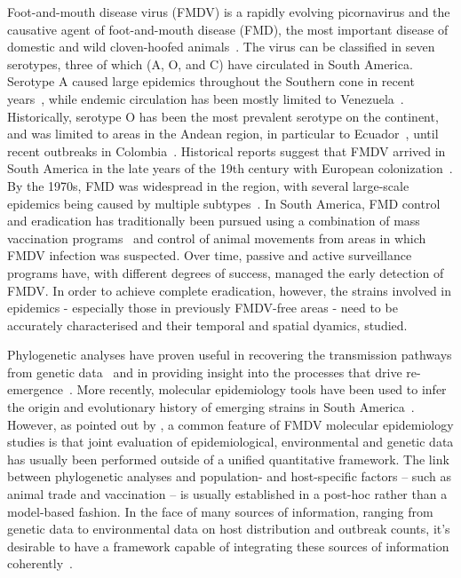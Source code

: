 \documentclass[10pt]{article}
\begin{document}
Foot-and-mouth disease virus (FMDV) is a rapidly evolving picornavirus and the causative agent of foot-and-mouth disease (FMD), the most important disease of domestic and wild cloven-hoofed animals~\citep{Grubman2004}.
The virus can be classified in seven serotypes, three of which (A, O, and C) have circulated in South America.
Serotype A caused large epidemics throughout the Southern cone in recent years~\citep{Perez2001, Malirat2012}, while endemic circulation has been mostly limited to Venezuela~\citep{Malirat2012}.
Historically, serotype O has been the most prevalent serotype on the continent, and was limited to areas in the Andean region, in particular to Ecuador~\citep{Malirat2011}, until recent outbreaks in Colombia~\citep{OIE2017, OIE2018}.
Historical reports suggest that FMDV arrived in South America in the late years of the 19th century with European colonization~\citep{Naranjo2013, Tully2008}. 
By the 1970s, FMD was widespread in the region, with several large-scale epidemics being caused by multiple subtypes~\citep{Saraiva2003}.
In South America, FMD control and eradication has traditionally been pursued using a combination of mass vaccination programs~\citep{Saraiva2004b} and control of animal movements from areas in which FMDV infection was suspected.
Over time, passive and active surveillance programs have, with different degrees of success, managed the early detection of FMDV.
In order to achieve complete eradication, however, the strains involved in epidemics - especially those in previously FMDV-free areas - need to be accurately characterised and their temporal and spatial dyamics, studied.

Phylogenetic analyses have proven useful in recovering the transmission pathways from genetic data~\citep{Cottam2008a, Cottam2008b} and in providing insight into the processes that drive re-emergence~\citep{DiNardo2011}.
More recently, molecular epidemiology tools have been used to infer the origin and evolutionary history of emerging strains in South America~\citep{Perez2001, Malirat2007, Malirat2011, Maradei2013}.
However, as pointed out by \citet{DiNardo2011}, a common feature of FMDV molecular epidemiology studies is that joint evaluation of epidemiological, environmental and genetic data has usually been performed outside of a unified quantitative framework.
The link between phylogenetic analyses and population- and host-specific factors -- such as animal trade and vaccination -- is usually established in a post-hoc rather than a model-based fashion.
In the face of many sources of information, ranging from genetic data to environmental data on host distribution and outbreak counts, it's desirable to have a framework capable of integrating these sources of information coherently~\citep{Lemey2014, Dudas2017}. %
\end{document}
